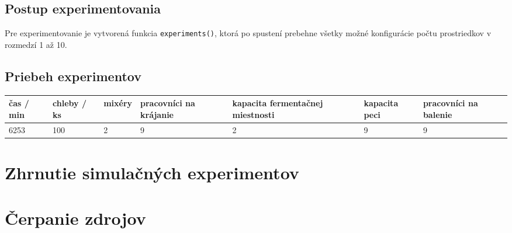 \documentclass[a4paper, 10pt]{article}
\begin{document}
    \subsection{Postup experimentovania}
    Pre experimentovanie je vytvorená funkcia \texttt{experiments()}, ktorá po spustení prebehne všetky možné
    konfigurácie počtu prostriedkov v rozmedzí 1 až 10.

    \subsection{Priebeh experimentov}

    \begin{center}
        \begin{tabular}{ |p{2cm}|p{2cm}|p{2cm}|p{2cm}|p{2cm}|p{2cm}|p{2cm}| }
            \hline
            čas / min & chleby / ks & mixéry & pracovníci na krájanie & kapacita fermentačnej miestnosti & kapacita peci & pracovníci na balenie \\
            \hline\hline
            6253       & 100         & 2       & 9                        & 2                                 & 9             & 9                 \\
            \hline
        \end{tabular}
    \end{center}

    \section{Zhrnutie simulačných experimentov}

    \section {Čerpanie zdrojov}

    \newpage
    
    
\end{document}
